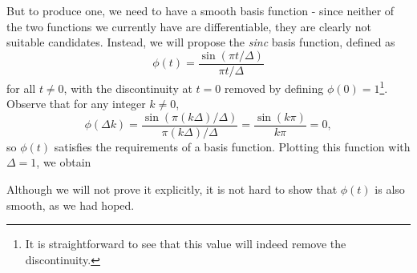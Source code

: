 \documentclass[letterpaper]{article}
\theoremstyle{remark}
\begin{document}
But to produce one, we need to have a smooth basis function - since neither of the two functions we currently have are differentiable, they are clearly not suitable candidates. Instead, we will propose the \emph{sinc} basis function, defined as
\[
    \phi(t) = \frac{\sin{(\pi t / \Delta)}}{\pi t / \Delta}
\]
for all $t \ne 0$, with the discontinuity at $t = 0$ removed by defining $\phi(0) = 1$\footnote{It is straightforward to see that this value will indeed remove the discontinuity.}. Observe that for any integer $k \ne 0$,
\[
    \phi(\Delta k) = \frac{\sin{(\pi (k\Delta) / \Delta)}}{\pi (k\Delta) / \Delta} = \frac{\sin(k\pi)}{k\pi} = 0,
\]
so $\phi(t)$ satisfies the requirements of a basis function. Plotting this function with $\Delta = 1$, we obtain
\begin{center}
\end{center}
Although we will not prove it explicitly, it is not hard to show that $\phi(t)$ is also smooth, as we had hoped.
\end{document}
